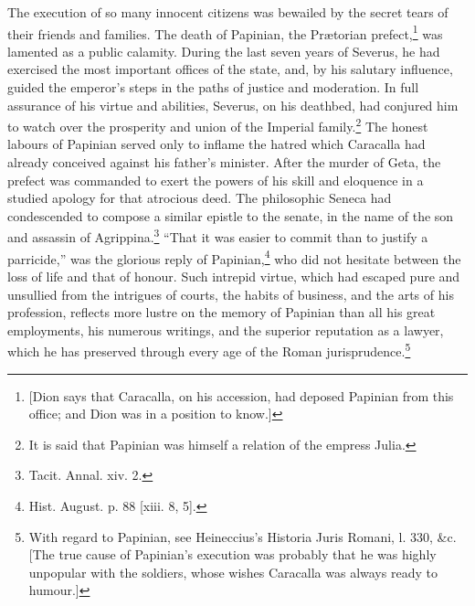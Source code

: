 The execution of so many innocent citizens was bewailed by the secret tears of their friends and families. The death of Papinian, the Prætorian prefect,\footnote{[Dion says that Caracalla, on his accession, had deposed Papinian from this office; and Dion was in a position to know.]} was lamented as a public calamity. During the last seven years of Severus, he had exercised the most important offices of the state, and, by his salutary influence, guided the emperor\texthebrew{}’s steps in the paths of justice and moderation. In full assurance of his virtue and abilities, Severus, on his deathbed, had conjured him to watch over the prosperity and union of the Imperial family.\footnote{It is said that Papinian was himself a relation of the empress Julia.} The honest labours of Papinian served only to inflame the hatred which Caracalla had already conceived against his father\texthebrew{}’s minister. After the murder of Geta, the prefect was commanded to exert the powers of his skill and eloquence in a studied apology for that atrocious deed. The philosophic Seneca had condescended to compose a similar epistle to the senate, in the name of the son and assassin of Agrippina.\footnote{Tacit. Annal. xiv. 2.} \texthebrew{“}That it was easier to commit than to justify a parricide,\texthebrew{}” was the glorious reply of Papinian,\footnote{Hist. August. p. 88 [xiii. 8, 5].} who did not hesitate between the loss of life and that of honour. Such intrepid virtue, which had escaped pure and unsullied from the intrigues of courts, the habits of business, and the arts of his profession, reflects more lustre on the memory of Papinian than all his great employments, his numerous writings, and the superior reputation as a lawyer, which he has preserved through every age of the Roman jurisprudence.\footnote{With regard to Papinian, see Heineccius\texthebrew{}’s Historia Juris Romani, l. 330, \&c. [The true cause of Papinian\texthebrew{}’s execution was probably that he was highly unpopular with the soldiers, whose wishes Caracalla was always ready to humour.]}

